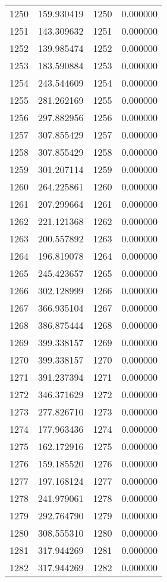 \documentclass[12pt]{article}
\begin{document}
\begin{longtable}{@{}cccc@{}}
1250 & 159.930419 & 1250 & 0.000000 \\
1251 & 143.309632 & 1251 & 0.000000 \\
1252 & 139.985474 & 1252 & 0.000000 \\
1253 & 183.590884 & 1253 & 0.000000 \\
1254 & 243.544609 & 1254 & 0.000000 \\
1255 & 281.262169 & 1255 & 0.000000 \\
1256 & 297.882956 & 1256 & 0.000000 \\
1257 & 307.855429 & 1257 & 0.000000 \\
1258 & 307.855429 & 1258 & 0.000000 \\
1259 & 301.207114 & 1259 & 0.000000 \\
1260 & 264.225861 & 1260 & 0.000000 \\
1261 & 207.299664 & 1261 & 0.000000 \\
1262 & 221.121368 & 1262 & 0.000000 \\
1263 & 200.557892 & 1263 & 0.000000 \\
1264 & 196.819078 & 1264 & 0.000000 \\
1265 & 245.423657 & 1265 & 0.000000 \\
1266 & 302.128999 & 1266 & 0.000000 \\
1267 & 366.935104 & 1267 & 0.000000 \\
1268 & 386.875444 & 1268 & 0.000000 \\
1269 & 399.338157 & 1269 & 0.000000 \\
1270 & 399.338157 & 1270 & 0.000000 \\
1271 & 391.237394 & 1271 & 0.000000 \\
1272 & 346.371629 & 1272 & 0.000000 \\
1273 & 277.826710 & 1273 & 0.000000 \\
1274 & 177.963436 & 1274 & 0.000000 \\
1275 & 162.172916 & 1275 & 0.000000 \\
1276 & 159.185520 & 1276 & 0.000000 \\
1277 & 197.168124 & 1277 & 0.000000 \\
1278 & 241.979061 & 1278 & 0.000000 \\
1279 & 292.764790 & 1279 & 0.000000 \\
1280 & 308.555310 & 1280 & 0.000000 \\
1281 & 317.944269 & 1281 & 0.000000 \\
1282 & 317.944269 & 1282 & 0.000000 \\

\end{longtable}
\end{document}

